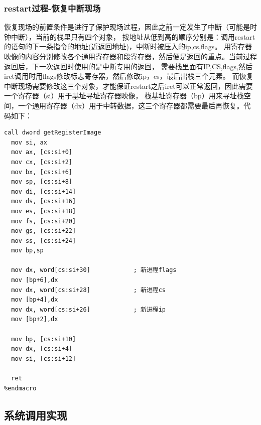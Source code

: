 \documentclass[a4paper, 11pt]{article} %
\begin{document}
\subsubsection{restart过程-恢复中断现场}
恢复现场的前置条件是进行了保护现场过程，因此之前一定发生了中断（可能是时钟中断），当前的栈里只有四个对象，
按地址从低到高的顺序分别是：调用restart的语句的下一条指令的地址(近返回地址)，中断时被压入的ip,cs,flags。
用寄存器映像的内容分别修改各个通用寄存器和段寄存器，然后便是返回的重点。当前过程返回后，下一次返回时使用的是中断专用的返回，
需要栈里面有IP,CS,flags,然后iret调用时用flags修改标志寄存器，然后修改ip，cs，最后出栈三个元素。
而恢复中断现场需要修改这三个对象，才能保证restart之后iret可以正常返回，因此需要一个寄存器（si）用于基址寻址寄存器映像，
栈基址寄存器（bp）用来寻址栈空间，一个通用寄存器（dx）用于中转数据，这三个寄存器都需要最后再恢复。代码如下：
\begin{lstlisting}[language={[x86masm]Assembler},label=restart,caption=restart过程]
  call dword getRegisterImage
  mov si, ax
  mov ax, [cs:si+0]
  mov cx, [cs:si+2]
  mov bx, [cs:si+6]
  mov sp, [cs:si+8]
  mov di, [cs:si+14]
  mov ds, [cs:si+16]
  mov es, [cs:si+18]
  mov fs, [cs:si+20]
  mov gs, [cs:si+22]
  mov ss, [cs:si+24]
  mov bp,sp

  mov dx, word[cs:si+30]            ; 新进程flags
  mov [bp+6],dx
  mov dx, word[cs:si+28]            ; 新进程cs
  mov [bp+4],dx
  mov dx, word[cs:si+26]            ; 新进程ip
  mov [bp+2],dx
  
  mov bp, [cs:si+10]
  mov dx, [cs:si+4]
  mov si, [cs:si+12]
  
  ret
%endmacro
\end{lstlisting}

\subsection{系统调用实现}
\end{document}
